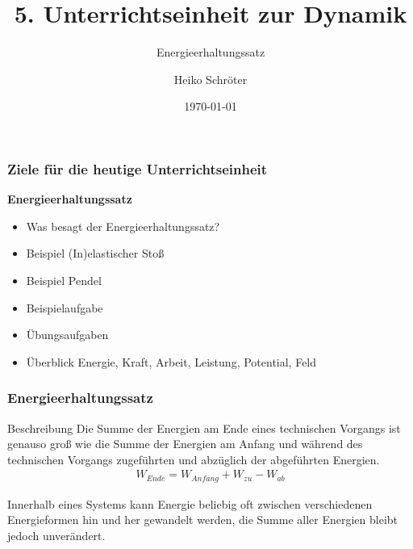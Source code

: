 \documentclass{article}
\title{5. Unterrichtseinheit zur Dynamik}
\subtitle{Energieerhaltungssatz}
\author{Heiko Schröter}
\date{\today}
\begin{document}
\frame{\titlepage}

\frame
{
  \frametitle{Ziele für die heutige Unterrichtseinheit}
  \textbf{Energieerhaltungssatz}
  \begin{itemize}
	\item Was besagt der Energieerhaltungssatz?
	\item Beispiel (In)elastischer Stoß
	\item Beispiel Pendel
	\item Beispielaufgabe
	\item Übungsaufgaben
	\item Überblick Energie, Kraft, Arbeit, Leistung, Potential, Feld
  \end{itemize}
}

\frame
{
  \frametitle{Energieerhaltungssatz}
\begin{block}{Beschreibung}
Die Summe der Energien am Ende eines technischen Vorgangs ist genauso groß wie die Summe der Energien am Anfang und während des technischen Vorgangs zugeführten und abzüglich der abgeführten Energien.
\begin{align*}
W_{Ende}=W_{Anfang}+W_{zu}-W_{ab}
\end{align*}
\end{block}
Innerhalb eines Systems kann Energie beliebig oft zwischen verschiedenen Energieformen hin und her gewandelt werden, die Summe aller Energien bleibt jedoch unverändert.
}
\end{document}

